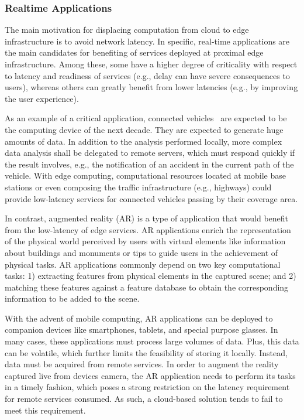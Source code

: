 \subsubsection{Realtime Applications}

The main motivation for displacing computation from cloud to edge infrastructure is to avoid network latency. In specific, real-time applications are the main candidates for benefiting of services deployed at proximal edge infrastructure. Among these, some have a higher degree of criticality with respect to latency and readiness of services (e.g., delay can have severe consequences to users), whereas others can greatly benefit from lower latencies (e.g., by improving the user experience).

As an example of a critical application, connected vehicles~\cite{} are expected to be the computing device of the next decade. They are expected to generate huge amounts of data. In addition to the analysis performed locally, more complex data analysis shall be delegated to remote servers, which must respond quickly if the result involves, e.g., the notification of an accident in the current path of the vehicle. With edge computing, computational resources located at mobile base stations or even composing the traffic infrastructure (e.g., highways) could provide low-latency services for connected vehicles passing by their coverage area.

In contrast, augmented reality (AR) is a type of application that would benefit from the low-latency of edge services. AR applications enrich the representation of the physical world perceived by users with virtual elements like information about buildings and monuments or tips to guide users in the achievement of physical tasks. AR applications commonly depend on two key computational tasks: 1) extracting features from physical elements in the captured scene; and 2) matching these features against a feature database to obtain the corresponding information to be added to the scene. 

With the advent of mobile computing, AR applications can be deployed to companion devices like smartphones, tablets, and special purpose glasses. In many cases, these applications must process large volumes of data. Plus, this data can be volatile, which further limits the feasibility of storing it locally. Instead, data must be acquired from remote services. In order to augment the reality captured live from devices camera, the AR application needs to perform its tasks in a timely fashion, which poses a strong restriction on the latency requirement for remote services consumed. As such, a cloud-based solution tends to fail to meet this requirement. 

